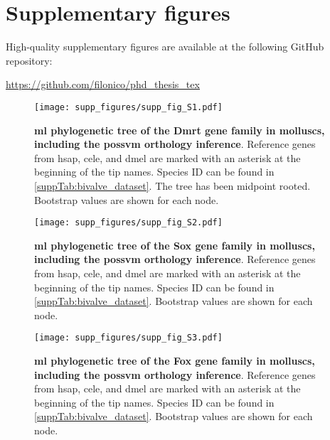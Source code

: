 
% 

{
\chapter*{Supplementary figures}
\label{supp_fig}
}

High-quality supplementary figures are available at the following GitHub repository:

\underline{\href{https://github.com/filonico/phd_thesis_tex}{https://github.com/filonico/phd\_thesis\_tex}}

\setcounter{figure}{0}
\renewcommand{\figurename}{Supplementary Figure}
\renewcommand{\thefigure}{\textbf{S\arabic{figure}}}

\begin{figure}[ht]
	\centering
	\texttt{[image: supp\_figures/supp\_fig\_S1.pdf]}
	\caption[\textbf{\gls{ml} phylogenetic tree of the Dmrt gene family in molluscs, including the possvm orthology inference}]
	{
		\textbf{\gls{ml} phylogenetic tree of the Dmrt gene family in molluscs, including the possvm orthology inference}. Reference genes from \gls{hsap}, \gls{cele}, and \gls{dmel} are marked with an asterisk at the beginning of the tip names. Species ID can be found in \cref{suppTab:bivalve_dataset}. The tree has been midpoint rooted. Bootstrap values are shown for each node.
	}
	\label{suppFig:dmrt_bivalves}
\end{figure}

\begin{figure}[ht]
	\centering
	\texttt{[image: supp\_figures/supp\_fig\_S2.pdf]}
	\caption[\textbf{\gls{ml} phylogenetic tree of the Sox gene family in molluscs, including the possvm orthology inference}]
	{
		\textbf{\gls{ml} phylogenetic tree of the Sox gene family in molluscs, including the possvm orthology inference}. Reference genes from \gls{hsap}, \gls{cele}, and \gls{dmel} are marked with an asterisk at the beginning of the tip names. Species ID can be found in \cref{suppTab:bivalve_dataset}. Bootstrap values are shown for each node.
	}
	\label{suppFig:sox_bivalves}
\end{figure}

\begin{figure}[ht]
	\centering
	\texttt{[image: supp\_figures/supp\_fig\_S3.pdf]}
	\caption[\textbf{\gls{ml} phylogenetic tree of the Fox gene family in molluscs, including the possvm orthology inference}]
	{
		\textbf{\gls{ml} phylogenetic tree of the Fox gene family in molluscs, including the possvm orthology inference}. Reference genes from \gls{hsap}, \gls{cele}, and \gls{dmel} are marked with an asterisk at the beginning of the tip names. Species ID can be found in \cref{suppTab:bivalve_dataset}. Bootstrap values are shown for each node.
	}
	\label{suppFig:fox_bivalves}
\end{figure}

